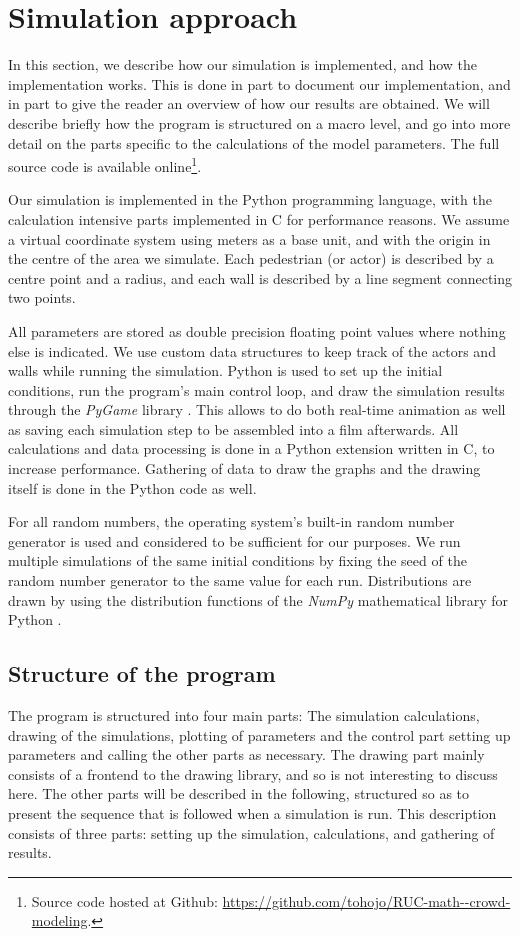 \section{Simulation approach}
\label{sec:simulation}
In this section, we describe how our simulation is implemented, and how the 
implementation works. This is done in part to document our implementation, and 
in part to give the reader an overview of how our results are obtained.
We will describe briefly how the program is structured on a macro level, and 
go into more detail on the parts specific to the calculations of the model 
parameters. The full source code is available online\footnote{Source code 
hosted at Github: \url{https://github.com/tohojo/RUC-math--crowd-modeling}.}.


Our simulation is implemented in the Python programming language, with the 
calculation intensive parts implemented in C for performance reasons. We 
assume a virtual coordinate system using meters as a base unit, and with the 
origin in the centre of the area we simulate. Each pedestrian (or actor) is 
described by a centre point and a radius, and each wall is described by a line 
segment connecting two points.

All parameters are stored as double precision floating point values where 
nothing else is indicated. We use custom data structures to keep track of the 
actors and walls while running the simulation. Python is used to set up the 
initial conditions, run the program's main control loop, and draw the 
simulation results through the \emph{PyGame} library \cite{pygame}. This 
allows to do both real-time animation as well as saving each simulation step 
to be assembled into a film afterwards. All calculations and data processing 
is done in a Python extension written in C, to increase performance. Gathering 
of data to draw the graphs and the drawing itself is done in the Python code 
as well. 

For all random numbers, the operating system's built-in random number 
generator is used and considered to be sufficient for our purposes. We run 
multiple simulations of the same initial conditions by fixing the seed of the 
random number generator to the same value for each run. Distributions are 
drawn by using the distribution functions of the \emph{NumPy} mathematical 
library for Python \cite{numpy}.

\subsection{Structure of the program}
The program is structured into four main parts: The simulation calculations, 
drawing of the simulations, plotting of parameters and the control part 
setting up parameters and calling the other parts as necessary. The drawing 
part mainly consists of a frontend to the drawing library, and so is not 
interesting to discuss here. The other parts will be described in the 
following, structured so as to present the sequence that is followed when a 
simulation is run. This description consists of three parts: setting up the 
simulation, calculations, and gathering of results.

